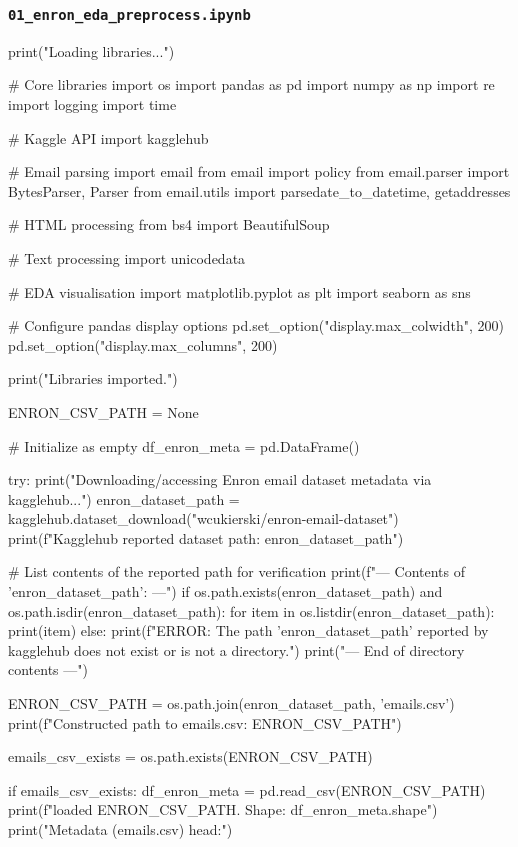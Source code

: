 \subsubsection*{\texttt{01\_enron\_eda\_preprocess.ipynb}}

\begin{ffcode}
print("Loading libraries...")

# Core libraries
import os
import pandas as pd
import numpy as np
import re
import logging
import time

# Kaggle API
import kagglehub

# Email parsing
import email
from email import policy
from email.parser import BytesParser, Parser
from email.utils import parsedate_to_datetime, getaddresses

# HTML processing
from bs4 import BeautifulSoup

# Text processing
import unicodedata

# EDA visualisation
import matplotlib.pyplot as plt
import seaborn as sns

# Configure pandas display options
pd.set_option("display.max_colwidth", 200)
pd.set_option("display.max_columns", 200)

print("Libraries imported.")

ENRON_CSV_PATH = None

# Initialize as empty
df_enron_meta = pd.DataFrame()

try:
    print("Downloading/accessing Enron email dataset metadata via kagglehub...")
    enron_dataset_path = kagglehub.dataset_download("wcukierski/enron-email-dataset")
    print(f"Kagglehub reported dataset path: {enron_dataset_path}")

    # List contents of the reported path for verification
    print(f"\n--- Contents of '{enron_dataset_path}': ---")
    if os.path.exists(enron_dataset_path) and os.path.isdir(enron_dataset_path):
        for item in os.listdir(enron_dataset_path):
            print(item)
    else:
        print(f"ERROR: The path '{enron_dataset_path}' reported by kagglehub does not exist or is not a directory.")
    print("--- End of directory contents ---\n")

    ENRON_CSV_PATH = os.path.join(enron_dataset_path, 'emails.csv')
    print(f"Constructed path to emails.csv: {ENRON_CSV_PATH}")

    emails_csv_exists = os.path.exists(ENRON_CSV_PATH)

    if emails_csv_exists:
        df_enron_meta = pd.read_csv(ENRON_CSV_PATH)
        print(f"\nSuccessfully loaded {ENRON_CSV_PATH}. Shape: {df_enron_meta.shape}")
        print("Metadata (emails.csv) head:")


\end{ffcode}
